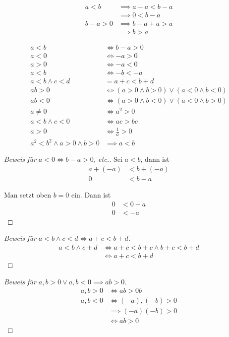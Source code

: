 \begin{example}
  \begin{align*}
    a < b &\implies a-a < b-a \\
    \,&\implies 0 < b-a \\
    b-a > 0 &\implies b-a+a > a \\
    \,&\implies b > a
  \end{align*}
\end{example}

\begin{theorem}
  \begin{align*}
    a < b &\iff b-a > 0 \\
    a < 0 &\iff -a > 0 \\
    a > 0 &\iff -a < 0 \\
    a < b &\iff -b < -a \\
    a < b \wedge c < d &= a+c < b+d \\
    ab > 0 &\iff (a > 0 \wedge b > 0) \vee (a < 0 \wedge b < 0) \\
    ab < 0 &\iff (a > 0 \wedge b < 0) \vee (a < 0 \wedge b > 0) \\
    a \ne 0 &\iff a^2 > 0 \\
    a < b \wedge c < 0 &\iff ac > bc \\
    a > 0 &\iff \frac{1}{a} > 0 \\
    a^2 < b^2 \wedge a > 0 \wedge b > 0 &\implies a < b
  \end{align*}
\end{theorem}
\begin{proof}[Beweis für $a < 0 \iff b-a > 0$, etc.]
  Sei $a < b$, dann ist
  \begin{align*}
    a + (-a) &< b + (-a) \\
    0 &< b - a
  \end{align*}

  Man setzt oben $b = 0$ ein. Dann ist
  \begin{align*}
    0 &< 0 - a \\
    0 &< -a
  \end{align*}
\end{proof}
\begin{proof}[Beweis für $a < b \wedge c < d \iff a+c < b+d$]
  \begin{align*}
    a < b \wedge c + d &\iff a + c < b + c \wedge b + c < b + d \\
    \,&\iff a + c < b + d
  \end{align*}
\end{proof}
\begin{proof}[Beweis für $a, b > 0 \vee a, b < 0 \implies ab > 0$]
  \begin{align*}
    a, b > 0 &\iff ab > 0b \\
    a, b < 0 &\iff (-a), (-b) > 0 \\
    \,&\implies (-a)(-b) > 0 \\
    \,&\iff ab > 0
  \end{align*}
\end{proof}

